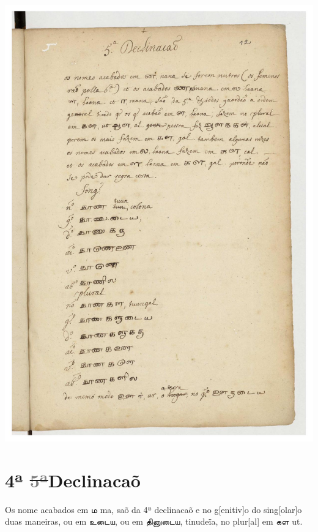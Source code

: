 \documentclass[12pt,a4paper]{scrbook}
\begin{document}
      
\newpage
\hypertarget{img-33}{
    \includegraphics[width=\textwidth]{img-33}}
\newpage
      \chapter*{4ª \sout{\textcolor{gray}{5ª}}Declinacaõ}
    
      

 Os nome acabados em ம ma, saõ da 4ª declinacaõ
             e no g[enitiv]o do sing[olar]o duas maneiras, ou em உடைய, ou 
	      em தினுடைய, tinudeïa, no plur[al] em கள ut. 
        
\end{document}
